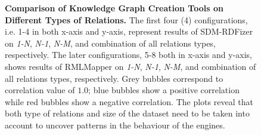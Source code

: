 \begin{figure}[!tb]
    \centering
    \qquad
    \caption{\textbf{Comparison of Knowledge Graph Creation Tools on Different Types of Relations.} The first four (4) configurations, i.e. 1-4 in both x-axis and y-axis, represent results of SDM-RDFizer on \textit{1-N}, \textit{N-1}, \textit{N-M}, and combination of all relations types, respectively. The later configurations, 5-8 both in x-axis and y-axis, shows results of RMLMapper on \textit{1-N}, \textit{N-1}, \textit{N-M}, and combination of all relations types, respectively. Grey bubbles correspond to correlation value of $1.0$; blue bubbles show a positive correlation while red bubbles show a negative correlation. The plots reveal that both type of relations and size of the dataset need to be taken into account to uncover patterns in the behaviour of the engines. 
}
\end{figure}
